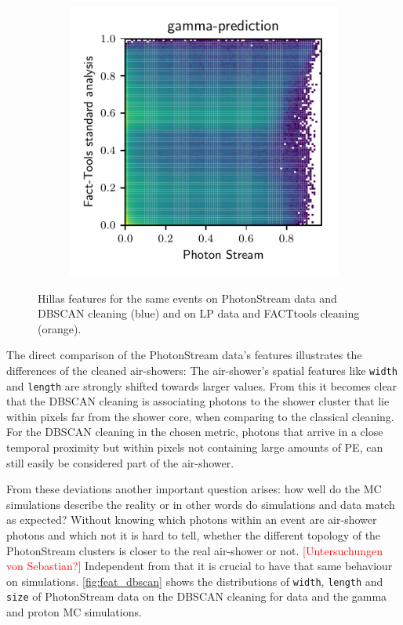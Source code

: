 \begin{figure}
\begin{subfigure}{0.5\textwidth}
  \end{subfigure}
  \begin{subfigure}{0.5\textwidth}
    \centering
    \includegraphics[width=\textwidth, page=4]{Plots/comparison_data_dl3.pdf}
  \end{subfigure}
  \caption{Hillas features for the same events on PhotonStream data and DBSCAN cleaning (blue) and on LP data and FACTtools cleaning (orange).}
  \label{fig:feat_comp}
\end{figure}
%
The direct comparison of the PhotonStream data's features illustrates the
differences of the cleaned air-showers: The air-shower's spatial features like
\texttt{width} and \texttt{length} are strongly shifted towards larger values.
From this it becomes clear that the DBSCAN cleaning is associating photons to
the shower cluster that lie within pixels far from the shower core, when
comparing to the classical cleaning. For the DBSCAN cleaning in the chosen
metric, photons that arrive in a close temporal proximity but within pixels not
containing large amounts of PE, can still easily be considered part of the
air-shower.

From these deviations another important question arises: how well do the MC
simulations describe the reality or in other words do simulations and data
match as expected? Without knowing which photons within an event are air-shower
photons and which not it is hard to tell, whether the different topology of the
PhotonStream clusters is closer to the real air-shower or not.
\textcolor{red}{[Untersuchungen von Sebastian?]} Independent from that it is crucial to
have that same behaviour on simulations. \autoref{fig:feat_dbscan} shows the
distributions of \texttt{width}, \texttt{length} and \texttt{size} of
PhotonStream data on the DBSCAN cleaning for data and the gamma and proton MC
simulations.


